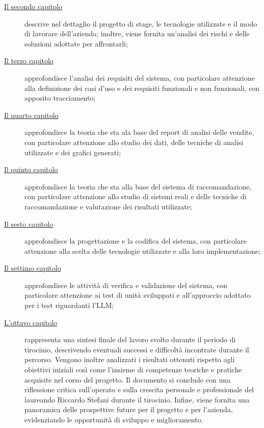 \begin{description}
    \item[{\hyperref[cap:descrizione-stage]{Il secondo capitolo}}] descrive nel dettaglio il progetto di stage, le tecnologie utilizzate e il modo di lavorare dell'azienda; inoltre, viene fornita un'analisi dei rischi e delle soluzioni adottate per affrontarli;
    
    \item[{\hyperref[cap:analisi-requisiti]{Il terzo capitolo}}] approfondisce l'analisi dei requisiti del sistema, con particolare attenzione alla definizione dei casi d'uso e dei requisiti funzionali e non funzionali, con apposito tracciamento;
    
    \item[{\hyperref[cap:report-vendite]{Il quarto capitolo}}] approfondisce la teoria che sta ala base del report di analisi delle vendite, con particolare attenzione allo studio dei dati, delle tecniche di analisi utilizzate e dei grafici generati;
    
    \item[{\hyperref[cap:sistemi-raccomandazione]{Il quinto capitolo}}] approfondisce la teoria che sta alla base del sistema di raccomandazione, con particolare attenzione allo studio di sistemi reali e delle tecniche di raccomandazione e valutazione dei risultati utilizzate;
    
    \item[{\hyperref[cap:progettazione-codifica]{Il sesto capitolo}}] approfondisce la progettazione e la codifica del sistema, con particolare attenzione alla scelta delle tecnologie utilizzate e alla loro implementazione;
    
    \item[{\hyperref[cap:verifica-validazione]{Il settimo capitolo}}] approfondisce le attività di verifica e validazione del sistema, con particolare attenzione ai test di unità sviluppati e all'approccio adottato per i test riguardanti l'LLM;
    
    \item[{\hyperref[cap:conclusioni]{L'ottavo capitolo}}] rappresenta una sintesi finale del lavoro svolto durante il periodo di tirocinio, descrivendo eventuali successi e difficoltà incontrate durante il percorso. Vengono inoltre analizzati i risultati ottenuti rispetto agli obiettivi iniziali così come l’insieme di competenze teoriche e pratiche acquisite nel corso del progetto. Il documento si conclude con una riflessione critica sull’operato e sulla crescita personale e professionale del laureando Riccardo Stefani durante il tirocinio. Infine, viene fornita una panoramica delle prospettive future per il progetto e per l'azienda, evidenziando le opportunità di sviluppo e miglioramento.

\end{description}

